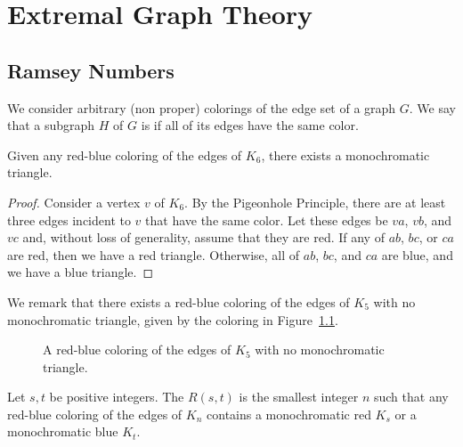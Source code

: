 \chapter{Extremal Graph Theory}

\section{Ramsey Numbers}

We consider arbitrary (non proper) colorings of the edge set of a graph \(G\).
We say that a subgraph \(H\) of \(G\) is  if all of its edges have the same color.

\begin{proposition} \label{prop:k6-monochromatic-triangle}
    Given any red-blue coloring of the edges of \(K_6\),
    there exists a monochromatic triangle.
\end{proposition}

\begin{proof}
    Consider a vertex \(v\) of \(K_6\).
    By the Pigeonhole Principle, there are at least three edges incident to \(v\) that have the same color.
    Let these edges be \(va\), \(vb\), and \(vc\) and, without loss of generality, assume that they are red.
    If any of \(ab\), \(bc\), or \(ca\) are red, then we have a red triangle.
    Otherwise, all of \(ab\), \(bc\), and \(ca\) are blue, and we have a blue triangle.
\end{proof}

We remark that there exists a red-blue coloring of the edges of \(K_5\) with no monochromatic triangle,
given by the coloring in Figure~\ref{fig:red-blue-coloring-k5}.

\begin{figure}[htbp]
    \centering
    \caption{A red-blue coloring of the edges of \(K_5\) with no monochromatic triangle.}
    \label{fig:red-blue-coloring-k5}
\end{figure}

\begin{definition}
    Let \(s, t\) be positive integers.
    The  \(R(s, t)\) is the smallest integer \(n\) such that any red-blue coloring of the edges of \(K_n\) contains
    a monochromatic red \(K_s\) or a monochromatic blue \(K_t\).
\end{definition}

